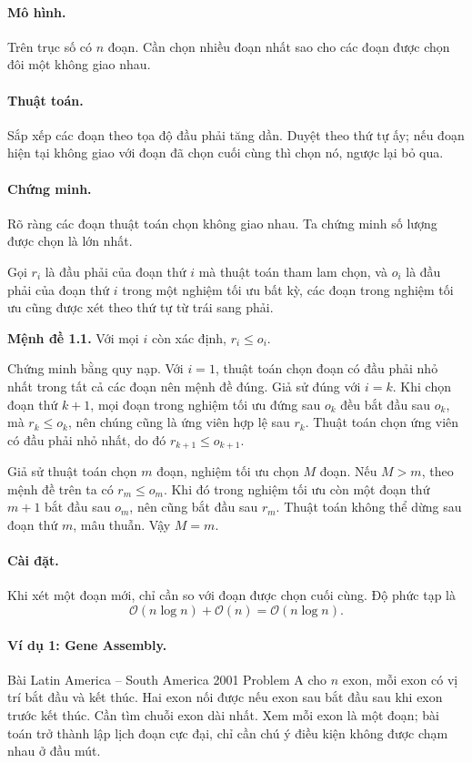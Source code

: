 \documentclass[11pt]{article}
\newcommand{\Oh}{\mathcal{O}}
\begin{document}
\paragraph{Mô hình.}
Trên trục số có \(n\) đoạn. Cần chọn nhiều đoạn nhất sao cho các đoạn được
chọn đôi một không giao nhau.

\paragraph{Thuật toán.}
Sắp xếp các đoạn theo tọa độ đầu phải tăng dần. Duyệt theo thứ tự ấy; nếu đoạn
hiện tại không giao với đoạn đã chọn cuối cùng thì chọn nó, ngược lại bỏ qua.

\paragraph{Chứng minh.}
Rõ ràng các đoạn thuật toán chọn không giao nhau. Ta chứng minh số lượng được
chọn là lớn nhất.

Gọi \(r_i\) là đầu phải của đoạn thứ \(i\) mà thuật toán tham lam chọn, và
\(o_i\) là đầu phải của đoạn thứ \(i\) trong một nghiệm tối ưu bất kỳ, các đoạn
trong nghiệm tối ưu cũng được xét theo thứ tự từ trái sang phải.

\textbf{Mệnh đề 1.1.} Với mọi \(i\) còn xác định, \(r_i\le o_i\).

Chứng minh bằng quy nạp. Với \(i=1\), thuật toán chọn đoạn có đầu phải nhỏ nhất
trong tất cả các đoạn nên mệnh đề đúng. Giả sử đúng với \(i=k\). Khi chọn đoạn
thứ \(k+1\), mọi đoạn trong nghiệm tối ưu đứng sau \(o_k\) đều bắt đầu sau
\(o_k\), mà \(r_k\le o_k\), nên chúng cũng là ứng viên hợp lệ sau \(r_k\).
Thuật toán chọn ứng viên có đầu phải nhỏ nhất, do đó \(r_{k+1}\le o_{k+1}\).

Giả sử thuật toán chọn \(m\) đoạn, nghiệm tối ưu chọn \(M\) đoạn. Nếu
\(M>m\), theo mệnh đề trên ta có \(r_m\le o_m\). Khi đó trong nghiệm tối ưu còn
một đoạn thứ \(m+1\) bắt đầu sau \(o_m\), nên cũng bắt đầu sau \(r_m\). Thuật
toán không thể dừng sau đoạn thứ \(m\), mâu thuẫn. Vậy \(M=m\).

\paragraph{Cài đặt.}
Khi xét một đoạn mới, chỉ cần so với đoạn được chọn cuối cùng. Độ phức tạp là
\[
  \Oh(n\log n)+\Oh(n)=\Oh(n\log n).
\]

\paragraph{Ví dụ 1: Gene Assembly.}
Bài Latin America -- South America 2001 Problem A cho \(n\) exon, mỗi exon có
vị trí bắt đầu và kết thúc. Hai exon nối được nếu exon sau bắt đầu sau khi exon
trước kết thúc. Cần tìm chuỗi exon dài nhất. Xem mỗi exon là một đoạn; bài toán
trở thành lập lịch đoạn cực đại, chỉ cần chú ý điều kiện không được chạm nhau ở
đầu mút.
\end{document}
